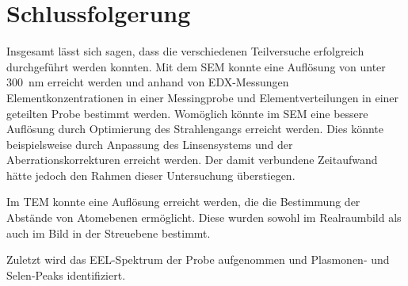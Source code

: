 \newpage
\section{Schlussfolgerung}

	Insgesamt lässt sich sagen, dass die verschiedenen Teilversuche erfolgreich durchgeführt werden konnten.
	Mit dem SEM konnte eine Auflösung von unter \SI{300}{nm} erreicht werden und anhand von EDX-Messungen Elementkonzentrationen in einer Messingprobe und Elementverteilungen in einer geteilten Probe bestimmt werden.
	Womöglich könnte im SEM eine bessere Auflösung durch Optimierung des Strahlengangs erreicht werden.
	Dies könnte beispielsweise durch Anpassung des Linsensystems und der Aberrationskorrekturen erreicht werden.
	Der damit verbundene Zeitaufwand hätte jedoch den Rahmen dieser Untersuchung überstiegen.

	Im TEM konnte eine Auflösung erreicht werden, die die Bestimmung der Abstände von Atomebenen ermöglicht.
	Diese wurden sowohl im Realraumbild als auch im Bild in der Streuebene bestimmt.

	Zuletzt wird das EEL-Spektrum der Probe aufgenommen und Plasmonen- und Selen-Peaks identifiziert.
